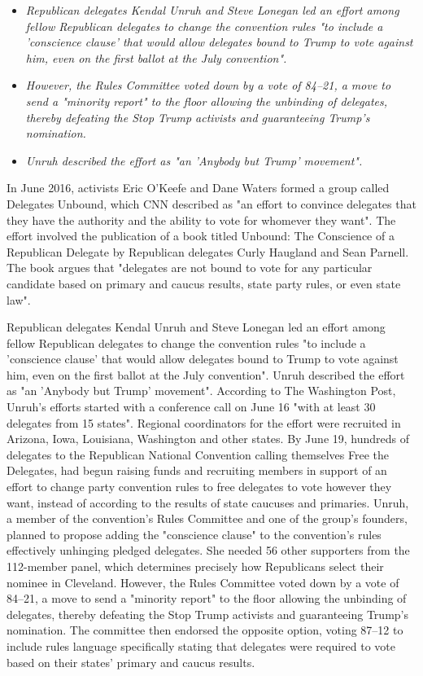 \begin{itemize}
\item
  \emph{Republican delegates Kendal Unruh and Steve Lonegan led an
  effort among fellow Republican delegates to change the convention
  rules "to include a 'conscience clause' that would allow delegates
  bound to Trump to vote against him, even on the first ballot at the
  July convention".}
\item
  \emph{However, the Rules Committee voted down by a vote of 84--21, a
  move to send a "minority report" to the floor allowing the unbinding
  of delegates, thereby defeating the Stop Trump activists and
  guaranteeing Trump's nomination.}
\item
  \emph{Unruh described the effort as "an 'Anybody but Trump'
  movement".}
\end{itemize}

In June 2016, activists Eric O'Keefe and Dane Waters formed a group
called Delegates Unbound, which CNN described as "an effort to convince
delegates that they have the authority and the ability to vote for
whomever they want". The effort involved the publication of a book
titled Unbound: The Conscience of a Republican Delegate by Republican
delegates Curly Haugland and Sean Parnell. The book argues that
"delegates are not bound to vote for any particular candidate based on
primary and caucus results, state party rules, or even state law".

Republican delegates Kendal Unruh and Steve Lonegan led an effort among
fellow Republican delegates to change the convention rules "to include a
'conscience clause' that would allow delegates bound to Trump to vote
against him, even on the first ballot at the July convention". Unruh
described the effort as "an 'Anybody but Trump' movement". According to
The Washington Post, Unruh's efforts started with a conference call on
June 16 "with at least 30 delegates from 15 states". Regional
coordinators for the effort were recruited in Arizona, Iowa, Louisiana,
Washington and other states. By June 19, hundreds of delegates to the
Republican National Convention calling themselves Free the Delegates,
had begun raising funds and recruiting members in support of an effort
to change party convention rules to free delegates to vote however they
want, instead of according to the results of state caucuses and
primaries. Unruh, a member of the convention's Rules Committee and one
of the group's founders, planned to propose adding the "conscience
clause" to the convention's rules effectively unhinging pledged
delegates. She needed 56 other supporters from the 112-member panel,
which determines precisely how Republicans select their nominee in
Cleveland. However, the Rules Committee voted down by a vote of 84--21,
a move to send a "minority report" to the floor allowing the unbinding
of delegates, thereby defeating the Stop Trump activists and
guaranteeing Trump's nomination. The committee then endorsed the
opposite option, voting 87--12 to include rules language specifically
stating that delegates were required to vote based on their states'
primary and caucus results.

